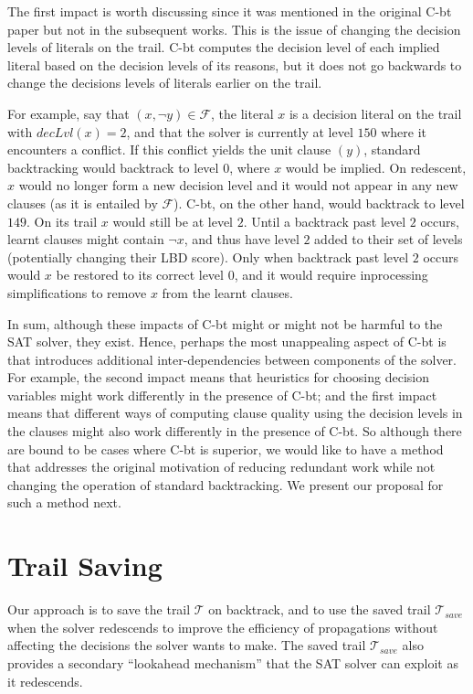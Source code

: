 \documentclass[runningheads]{llncs}
\newcommand{\sat}{SAT\xspace}
\newcommand{\trail}{\ensuremath{\mathcal{T}}}
\newcommand{\dlevel}[1]{\ensuremath{\mathit{decLvl}(#1)}}
\newcommand{\formula}{\ensuremath{\mathcal{F}}}
\newcommand{\cbt}{C-bt\xspace}
\newcommand{\trailsave}{\trail_{\mathit{save}}}
\begin{document}
The first impact is worth discussing since it was mentioned in the
original \cbt paper \cite{DBLP:conf/lpar/JiangZ13} but not in the
subsequent works. This is the issue of changing the decision levels of
literals on the trail. \cbt computes the decision level of each
implied literal based on the decision levels of its reasons, but it
does not go backwards to change the decisions levels of literals
earlier on the trail.

\begin{example}
    For example, say that $(x, \lnot y)\in \formula$, the literal $x$
    is a decision literal on the trail with $\dlevel{x}=2$, and that
    the solver is currently at level $150$ where it encounters a
    conflict. If this conflict yields the unit clause $(y)$, standard
    backtracking would backtrack to level $0$, where $x$ would be
    implied. On redescent, $x$ would no longer form a new decision
    level and it would not appear in any new clauses (as it is
    entailed by $\formula$). \cbt, on the other hand, would backtrack
    to level $149$. On its trail $x$ would still be at level
    $2$. Until a backtrack past level $2$ occurs, learnt clauses might
    contain $\lnot x$, and thus have level $2$ added to their set of
    levels (potentially changing their LBD score). Only when backtrack
    past level $2$ occurs would $x$ be restored to its correct level
    $0$, and it would require inprocessing simplifications to remove $x$
    from the learnt clauses.
\end{example}

In sum, although these impacts of \cbt might or might not be harmful
to the \sat solver, they exist. Hence, perhaps the most unappealing
aspect of \cbt is that introduces additional inter-dependencies
between components of the solver. For example, the second impact means
that heuristics for choosing decision variables might work differently
in the presence of \cbt; and the first impact means that different
ways of computing clause quality using the decision levels in the
clauses might also work differently in the presence of \cbt. So
although there are bound to be cases where \cbt is superior, we would
like to have a method that addresses the original motivation of
reducing redundant work while not changing the operation of standard
backtracking. We present our proposal for such a method next.

\section{Trail Saving}
Our approach is to save the trail $\trail$ on backtrack, and to use
the saved trail $\trailsave$ when the solver redescends to improve the
efficiency of propagations without affecting the decisions the solver
wants to make. The saved trail $\trailsave$ also provides a secondary
``lookahead mechanism'' that the \sat solver can exploit as it
redescends.
\end{document}
